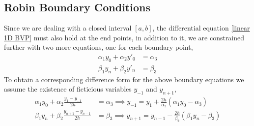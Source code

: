 \documentclass[12pt]{article}
\begin{document}
 	\subsection{Robin Boundary Conditions}
	
	Since we are dealing with a closed interval $ [a,b] $, the differential equation \ref{linear 1D BVP} must also hold at the end points, in addition to it, we are constrained further with two more equations, one for each boundary point,
	\begin{align}\label{robin}
		\alpha_1 y_0 + \alpha_2 y'_0 &= \alpha_3 \\
		\beta_1 y_n + \beta_2 y'_n &= \beta_3
	\end{align}
	To obtain a corresponding difference form for the above boundary equations we assume the existence of ficticious variables $ y_{-1} $ and $ y_{n+1} $, 
	\begin{align}\label{robin_DE}
		\alpha_1 y_0 + \alpha_2 \frac{y_{1} - y_{-1}}{2h} &= \alpha_3 \implies \boxed{y_{-1} = y_1 + \frac{2h}{\alpha_2}\left(\alpha_1 y_0 - \alpha_3\right)} \\
		\beta_1 y_n + \beta_2 \frac{y_{n+1} - y_{n-1}}{2h} &= \beta_3 \implies \boxed{y_{n+1} = y_{n-1} - \frac{2h}{\beta_2}\left(\beta_1 y_n - \beta_3\right)}
	\end{align}
	
\end{document}
